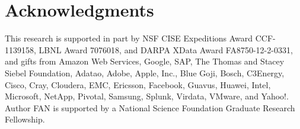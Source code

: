 \documentclass{sig-alternate}
\begin{document}
\section{Acknowledgments}
This research is supported in part by NSF CISE Expeditions Award CCF-1139158, LBNL Award 7076018, and DARPA XData Award FA8750-12-2-0331, and gifts from Amazon Web Services, Google, SAP,  The Thomas and Stacey Siebel Foundation, Adatao, Adobe, Apple, Inc., Blue Goji, Bosch, C3Energy, Cisco, Cray, Cloudera, EMC, Ericsson, Facebook, Guavus, Huawei, Intel, Microsoft, NetApp, Pivotal, Samsung, Splunk, Virdata, VMware, and Yahoo!. Author FAN is supported by a National Science Foundation Graduate Research Fellowship.

%

%
%



\balancecolumns

\end{document}
